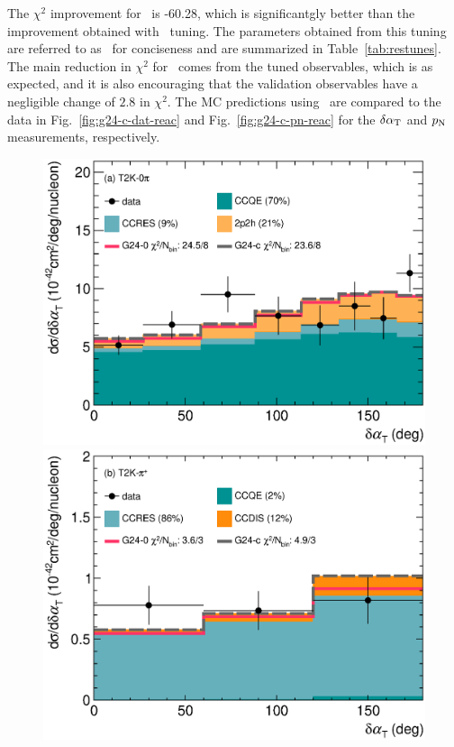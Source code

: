     The $\chi^2$ improvement for \cbRedPar\ is -60.28, which is significantgly better than the improvement obtained with \cbAllPar\ tuning.
    The parameters obtained from this tuning are referred to as \gC\ for conciseness and are summarized in Table~\ref{tab:restunes}.
    The main reduction in $\chi^2$ for \gC\ comes from the tuned observables, which is as expected, and it is also encouraging that the validation observables have a negligible change of $2.8$ in $\chi^2$.
    The MC predictions using \gC\ are compared to the data in Fig.~\ref{fig:g24-c-dat-reac} and Fig.~\ref{fig:g24-c-pn-reac} for the $\delta\alpha_\textrm{T}$ and $p_\textrm{N}$ measurements, respectively.
    \begin{figure} 
        \centering 		
        \includegraphics[width=\dbfigwid\textwidth]{figures/tuning/0026-t2k_0pi_dalphat_reac_decomp_covfix.eps}
        \includegraphics[width=\dbfigwid\textwidth]{figures/tuning/0026-t2k_pip_dalphat_reac_decomp_covfix.eps}

\end{figure}
